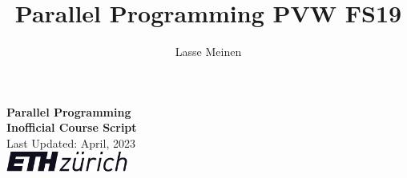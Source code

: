 \documentclass[titlepage, dvipsnames]{article}
\title{Parallel Programming PVW FS19}
\author{Lasse Meinen}
\theoremstyle{plain}
\theoremstyle{remark}
\theoremstyle{definition}
\begin{document}
    \renewcommand{\figurename}{Fig.}
    \renewcommand{\contentsname}{Table of Contents}
    \renewcommand{\thesubfigure}{\roman{subfigure}}

    \renewcommand{\ExerciseHeaderTitle}{\ExerciseTitle}
    \renewcommand{\ExerciseHeader}{\centerline{\textbf{\large\ExerciseName\ExerciseHeaderNB\ExerciseHeaderTitle\ExerciseHeaderOrigin}}\\}
    \renewcommand{\ExerciseListHeader}{\ExerciseHeaderDifficulty%
    \textbf{\ExerciseHeaderNB .%
    \ \ExerciseHeaderTitle \newline}%
    \ExerciseHeaderOrigin\ignorespaces}
    \renewcommand{\AnswerListHeader}{\textbf{\ExerciseHeaderNB. \ \ExerciseHeaderTitle}}
    \setlength{\Exesep}{1\baselineskip}
    \setlength{\QuestionBefore}{.2em}
    \setlength{\QuestionIndent}{2em}

    \makeatletter
        \begin{titlepage}
		\begin{center}
		\huge \textbf{Parallel Programming \\ Inofficial Course Script}
		\\ \bigskip
		\Large Last Updated: April, 2023
		\\ \bigskip
		\vfill
		{\includegraphics[width = 0.3\textwidth]{images/ETH.png}}
		\vfill
		\end{center}

	\end{titlepage}
    \makeatother
    \thispagestyle{empty}
    \newpage

    \setcounter{page}{1} %

    \tableofcontents
    \newpage
    
    \newpage
    
    \newpage
    
    \newpage
    
    \newpage
    
    \newpage
    
    \newpage
    
\end{document}
